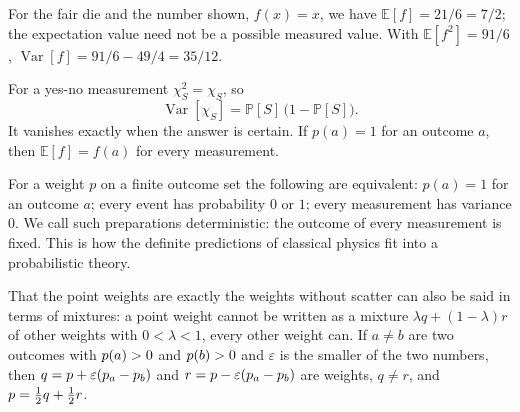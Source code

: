\begin{example}
	For the fair die and the number shown, $f(x) = x$, we have $\mathbb{E}[f] = 21/6 = 7/2$; the expectation value need not be a possible measured value. With $\mathbb{E}[f^2] = 91/6$, $\operatorname{Var}[f] = 91/6 - 49/4 = 35/12$.
\end{example}

For a yes-no measurement $\chi_S^2 = \chi_S$, so
\begin{equation}
	\operatorname{Var}[\chi_S] = \mathbb{P}[S]\,\bigl(1 - \mathbb{P}[S]\bigr).
\end{equation}
It vanishes exactly when the answer is certain. If $p(a) = 1$ for an outcome $a$, then $\mathbb{E}[f] = f(a)$ for every measurement.


\begin{merksatz}
For a weight $p$ on a finite outcome set the following are equivalent: $p(a) = 1$ for an outcome $a$; every event has probability $0$ or $1$; every measurement has variance $0$. We call such preparations deterministic: the outcome of every measurement is fixed. This is how the definite predictions of classical physics fit into a probabilistic theory.
\end{merksatz}

\begin{webonly}
That the point weights are exactly the weights without scatter can also be said in terms of mixtures: a point weight cannot be written as a mixture $\lambda q + (1-\lambda) r$ of other weights with $0<\lambda<1$, every other weight can. If $a \neq b$ are two outcomes with $p(a) > 0$ and $p(b) > 0$ and $\varepsilon$ is the smaller of the two numbers, then $q = p + \varepsilon(p_a - p_b)$ and $r = p - \varepsilon(p_a - p_b)$ are weights, $q \neq r$, and $p = \tfrac12 q + \tfrac12 r$.
\end{webonly}


